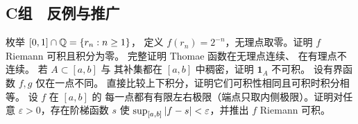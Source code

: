 \subsection*{C组　反例与推广}
\begin{enumerate}[label=\textbf{\thechapter.\arabic*.},resume]
  枚举 \([0,1]\cap\mathbb{Q}=\{r_n:n\ge1\}\)，
 定义 \(f(r_n)=2^{-n}\)，无理点取零。证明 \(f\) Riemann 可积且积分为零。
  完整证明 Thomae 函数在无理点连续、
 在有理点不连续。
  若 \(A\subset[a,b]\) 与
 其补集都在 \([a,b]\) 中稠密，证明 \(\mathbf1_A\) 不可积。
  设有界函数 \(f,g\) 仅在一点不同。
 直接比较上下积分，证明它们可积性相同且可积时积分相等。
  设 \(f\) 在 \([a,b]\) 的
 每一点都有有限左右极限（端点只取内侧极限）。证明对任意
 \(\varepsilon>0\)，存在阶梯函数 \(s\) 使
 \(\sup_{[a,b]}\left|f-s\right|<\varepsilon\)，并推出 \(f\) Riemann 可积。
\end{enumerate}
